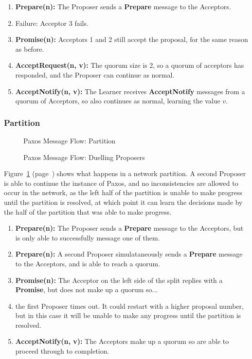 \documentclass[12pt,twoside,notitlepage]{report}
\newcommand{\lwincludegraphics}[2][]{%
  \sbox{0}{\texttt{[image: \#2]}}%
  \ifdim\wd0>\linewidth
    \resizebox{\linewidth}{!}{\box0 }%
  \else
    \leavevmode\box0
  \fi}
\newcommand{\msg}[1] {{\bf #1}}         %
\begin{document}
\begin{enumerate}
\item \msg{Prepare(n):} The Proposer sends a \msg{Prepare} message to the Acceptors.
\item Failure: Acceptor 3 fails.
\item \msg{Promise(n):} Acceptors 1 and 2 still accept the proposal, for the same reason as
	before.
\item \msg{AcceptRequest(n, v):} The quorum size is 2, so a quorum of acceptors has responded, and
	the Proposer can continue as normal.
\item \msg{AcceptNotify(n, v):} The Learner receives \msg{AcceptNotify} messages from a quorum of
	Acceptors, so also continues as normal, learning the value $v$.
\end{enumerate}

\subsubsection*{Partition}

\begin{figure}[h!]
\centering
\lwincludegraphics{figs/paxos-msg-flow-partition.eps}
\caption{\label{fig:paxos-partition}Paxos Message Flow: Partition}
\end{figure}

\begin{figure}[p]
\centering
\lwincludegraphics{figs/paxos-msg-flow-duelling.eps}
\caption{\label{fig:paxos-duelling}Paxos Message Flow: Duelling Proposers}
\end{figure}

Figure~\ref{fig:paxos-partition} (page~\pageref{fig:paxos-partition}) shows what happens in a
network partition. A second Proposer is able to continue the instance of Paxos, and no
inconsistencies are allowed to occur in the network, as the left half of the partition is unable
to make progress until the partition is resolved, at which point it can learn the decisions made
by the half of the partition that was able to make progress.

\begin{enumerate}
\item \msg{Prepare(n):} The Proposer sends a \msg{Prepare} message to the Acceptors, but is only
	able to successfully message one of them.
\item \msg{Prepare(n):} A second Proposer simulataneously sends a \msg{Prepare} message to the
	Acceptors, and is able to reach a quorum.
\item \msg{Promise(n):} The Acceptor on the left side of the split replies with a \msg{Promise},
	but does not make up a quorum so...
\item the first Proposer times out. It could restart with a higher proposal number, but in this
	case it will be unable to make any progress until the partition is resolved.
\item \msg{AcceptNotify(n, v):} The Acceptors make up a quorum so are able to proceed through to
	completion.
\end{enumerate}
\end{document}

